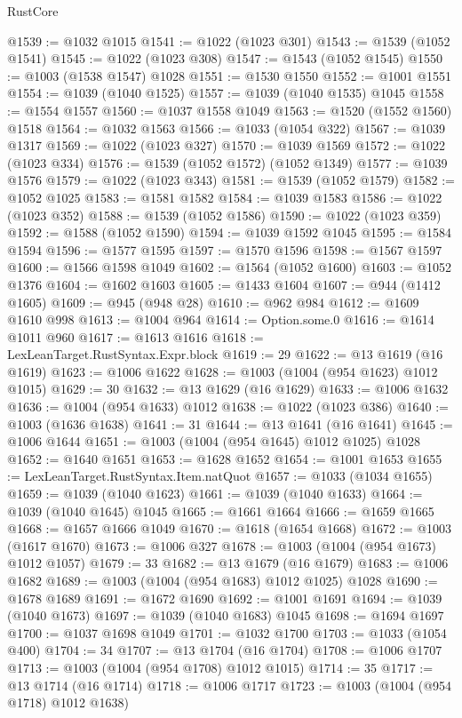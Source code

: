\begin{lexlean}{RustCore}
\begin{coremodule}
@1539 := @1032 @1015
@1541 := @1022 (@1023 @301)
@1543 := @1539 (@1052 @1541)
@1545 := @1022 (@1023 @308)
@1547 := @1543 (@1052 @1545)
@1550 := @1003 (@1538 @1547) @1028
@1551 := @1530 @1550
@1552 := @1001 @1551
@1554 := @1039 (@1040 @1525)
@1557 := @1039 (@1040 @1535) @1045
@1558 := @1554 @1557
@1560 := @1037 @1558 @1049
@1563 := @1520 (@1552 @1560) @1518
@1564 := @1032 @1563
@1566 := @1033 (@1054 @322)
@1567 := @1039 @1317
@1569 := @1022 (@1023 @327)
@1570 := @1039 @1569
@1572 := @1022 (@1023 @334)
@1576 := @1539 (@1052 @1572) (@1052 @1349)
@1577 := @1039 @1576
@1579 := @1022 (@1023 @343)
@1581 := @1539 (@1052 @1579)
@1582 := @1052 @1025
@1583 := @1581 @1582
@1584 := @1039 @1583
@1586 := @1022 (@1023 @352)
@1588 := @1539 (@1052 @1586)
@1590 := @1022 (@1023 @359)
@1592 := @1588 (@1052 @1590)
@1594 := @1039 @1592 @1045
@1595 := @1584 @1594
@1596 := @1577 @1595
@1597 := @1570 @1596
@1598 := @1567 @1597
@1600 := @1566 @1598 @1049
@1602 := @1564 (@1052 @1600)
@1603 := @1052 @1376
@1604 := @1602 @1603
@1605 := @1433 @1604
@1607 := @944 (@1412 @1605)
@1609 := @945 (@948 @28)
@1610 := @962 @984
@1612 := @1609 @1610 @998
@1613 := @1004 @964
@1614 := Option.some.{0}
@1616 := @1614 @1011 @960
@1617 := @1613 @1616
@1618 := LexLeanTarget.RustSyntax.Expr.block
@1619 := 29
@1622 := @13 @1619 (@16 @1619)
@1623 := @1006 @1622
@1628 := @1003 (@1004 (@954 @1623) @1012 @1015)
@1629 := 30
@1632 := @13 @1629 (@16 @1629)
@1633 := @1006 @1632
@1636 := @1004 (@954 @1633) @1012
@1638 := @1022 (@1023 @386)
@1640 := @1003 (@1636 @1638)
@1641 := 31
@1644 := @13 @1641 (@16 @1641)
@1645 := @1006 @1644
@1651 := @1003 (@1004 (@954 @1645) @1012 @1025) @1028
@1652 := @1640 @1651
@1653 := @1628 @1652
@1654 := @1001 @1653
@1655 := LexLeanTarget.RustSyntax.Item.natQuot
@1657 := @1033 (@1034 @1655)
@1659 := @1039 (@1040 @1623)
@1661 := @1039 (@1040 @1633)
@1664 := @1039 (@1040 @1645) @1045
@1665 := @1661 @1664
@1666 := @1659 @1665
@1668 := @1657 @1666 @1049
@1670 := @1618 (@1654 @1668)
@1672 := @1003 (@1617 @1670)
@1673 := @1006 @327
@1678 := @1003 (@1004 (@954 @1673) @1012 @1057)
@1679 := 33
@1682 := @13 @1679 (@16 @1679)
@1683 := @1006 @1682
@1689 := @1003 (@1004 (@954 @1683) @1012 @1025) @1028
@1690 := @1678 @1689
@1691 := @1672 @1690
@1692 := @1001 @1691
@1694 := @1039 (@1040 @1673)
@1697 := @1039 (@1040 @1683) @1045
@1698 := @1694 @1697
@1700 := @1037 @1698 @1049
@1701 := @1032 @1700
@1703 := @1033 (@1054 @400)
@1704 := 34
@1707 := @13 @1704 (@16 @1704)
@1708 := @1006 @1707
@1713 := @1003 (@1004 (@954 @1708) @1012 @1015)
@1714 := 35
@1717 := @13 @1714 (@16 @1714)
@1718 := @1006 @1717
@1723 := @1003 (@1004 (@954 @1718) @1012 @1638)

\end{coremodule}
\end{lexlean}
